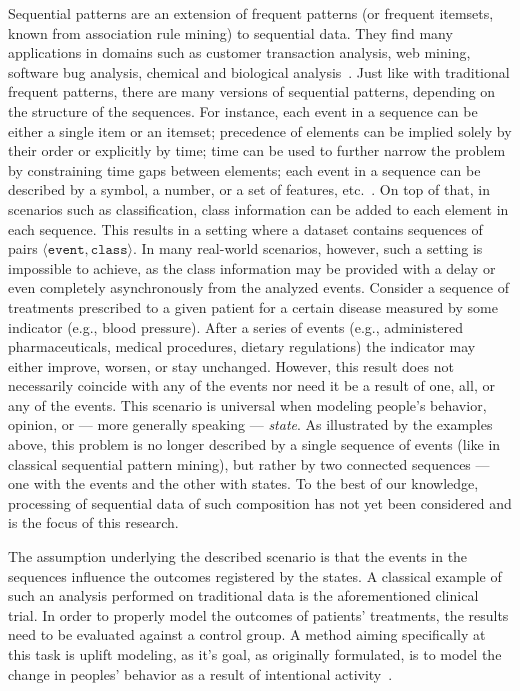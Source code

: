 \documentclass[runningheads,a4paper]{llncs}
\begin{document}
Sequential patterns are an extension of frequent patterns (or frequent itemsets, known from association rule mining) to sequential data.
They find many applications in domains such as customer transaction analysis, web mining, software bug analysis, chemical and biological analysis~\cite{Aggarwal:2014}.
Just like with traditional frequent patterns, there are many versions of sequential patterns, depending on the structure of the sequences.
For instance, each event in a sequence can be either a single item or an itemset; precedence of elements can be implied solely by their order or explicitly by time; time can be used to further narrow the problem by constraining time gaps between elements; each event in a sequence can be described by a symbol, a number, or a set of features, etc.~\cite{Dong:2009}.
On top of that, in scenarios such as classification, class information can be added to each element in each sequence.
This results in a setting where a dataset contains sequences of pairs $\langle\texttt{event}, \texttt{class}\rangle$.
In many real-world scenarios, however, such a setting is impossible to achieve, as the class information may be provided with a delay or even completely asynchronously from the analyzed events.
Consider a sequence of treatments prescribed to a given patient for a certain disease measured by some indicator (e.g., blood pressure).
After a series of events (e.g., administered pharmaceuticals, medical procedures, dietary regulations) the indicator may either improve, worsen, or stay unchanged.
However, this result does not necessarily coincide with any of the events nor need it be a result of one, all, or any of the events.
This scenario is universal when modeling people's behavior, opinion, or --- more generally speaking --- \textit{state}.
As illustrated by the examples above, this problem is no longer described by a single sequence of events (like in classical sequential pattern mining), but rather by two connected sequences --- one with the events and the other with states.
To the best of our knowledge, processing of sequential data of such composition has not yet been considered and is the focus of this research.

The assumption underlying the described scenario is that the events in the sequences influence the outcomes registered by the states.
A classical example of such an analysis performed on traditional data is the aforementioned clinical trial.
In order to properly model the outcomes of patients' treatments, the results need to be evaluated against a control group.
A method aiming specifically at this task is uplift modeling, as it's goal, as originally formulated, is to model the change in peoples' behavior as a result of intentional activity~\cite{Radcliffe:1999}.
\end{document}
